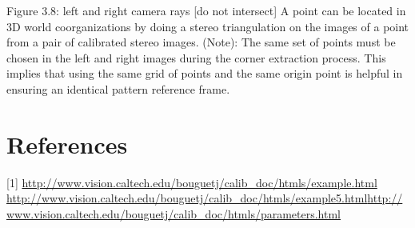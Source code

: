 \documentclass[a4paper, 12pt]{report}
\begin{document}
Figure 3.8: left and right camera rays [do not intersect]
\newline \newline
A point can be located in 3D world coorganizations by doing a stereo triangulation on the images of a point from a pair of calibrated stereo images.\newline
(Note): The same set of points must be chosen in the left and right images during the corner extraction process. This implies that using the same grid of points and the same origin point is helpful in ensuring an identical pattern reference frame. \newline 



\section{References}
[1] \url{http://www.vision.caltech.edu/bouguetj/calib_doc/htmls/example.html} \newline
[2] \url{http://www.vision.caltech.edu/bouguetj/calib_doc/htmls/example5.html}\newline
[3] \url{http://www.vision.caltech.edu/bouguetj/calib_doc/htmls/parameters.html}
\end{document}
